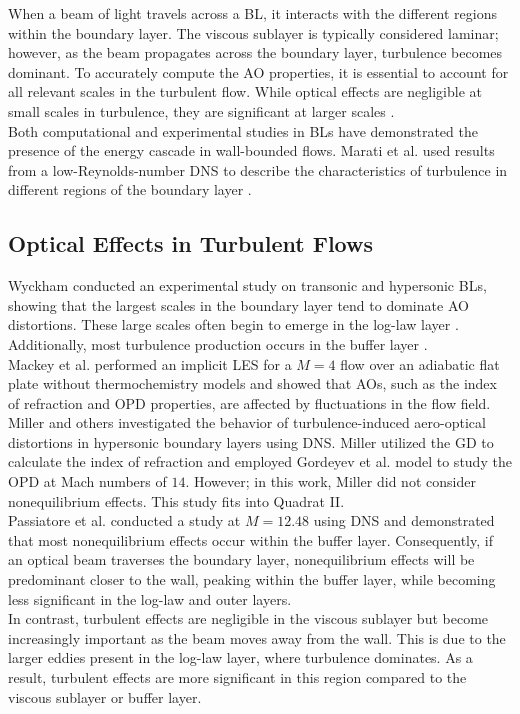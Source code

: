 When a beam of light travels across a \gls{BL}, it interacts with the different
regions within the boundary layer. The viscous sublayer is typically considered
laminar; however, as the beam propagates across the boundary layer, turbulence
becomes dominant. To accurately compute the \gls{AO} properties, it is
essential to account for all relevant scales in the turbulent flow. While
optical effects are negligible at small scales in turbulence, they are
significant at larger scales \cite{Wang2012}. \\

Both computational and experimental studies in \glspl{BL} have demonstrated the
presence of the energy cascade in wall-bounded flows. Marati et al. used
results from a low-Reynolds-number \gls{DNS} to describe the characteristics of
turbulence in different regions of the boundary layer \cite{Marati2004}. \\

\subsection{Optical Effects in Turbulent Flows}
Wyckham \cite{Wyckham2009} conducted an experimental study on transonic and
hypersonic \glspl{BL}, showing that the largest scales in the boundary layer
tend to dominate \gls{AO} distortions. These large scales often begin to emerge
in the log-law layer \cite{Jimenez2001}. Additionally, most turbulence
production occurs in the buffer layer \cite{Robinson1991}. \\

Mackey et al. \cite{Mackey2018} performed an implicit \gls{LES} for a $M = 4$
flow over an adiabatic flat plate without thermochemistry models and showed
that \glspl{AO}, such as the index of refraction and \gls{OPD} properties, are
affected by fluctuations in the flow field. \\

Miller \cite{CastilloGomez2022} and others investigated the behavior of
turbulence-induced aero-optical distortions in hypersonic
boundary layers using \gls{DNS}. Miller utilized the \gls{GD} to calculate the
index of refraction and employed Gordeyev et al. \cite{Gordeyev2012} model to
study the \gls{OPD} at Mach numbers of $14$. However; in this work, Miller did
not consider nonequilibrium effects. This study fits into Quadrat II. \\

Passiatore et al. \cite{Passiatore2022} conducted a study at $M = 12.48$ using
\gls{DNS} and demonstrated that most nonequilibrium effects occur within the
buffer layer. Consequently, if an optical beam traverses the boundary layer,
nonequilibrium effects will be predominant closer to the wall, peaking within
the buffer layer, while becoming less significant in the log-law and outer
layers.\\

In contrast, turbulent effects are negligible in the viscous sublayer but
become increasingly important as the beam moves away from the wall. This is due
to the larger eddies present in the log-law layer, where turbulence dominates.
As a result, turbulent effects are more significant in this region compared to
the viscous sublayer or buffer layer.
